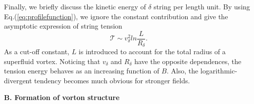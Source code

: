 \documentclass[12pt]{article}
\begin{document}
Finally, we briefly discuss the kinetic energy of $\delta$ string per length unit. 
By using Eq.(\ref{eq:profilefunction}), we ignore the constant
contribution and give the asymptotic expression of string tension 
\begin{equation}
  \label{eq:tension1}
  \mathcal{T} \sim v_\delta^2 ln\frac{L}{R_\delta}.
\end{equation}
As a cut-off constant, $L$ is introduced to account for the total radius of a superfluid vortex. 
Noticing that $v_\delta$ and $R_\delta$ have the opposite dependences, the tension energy behaves as an increasing function of $B$.
Also, the logarithmic-divergent tendency becomes much obvious for stronger fields.


\vspace{0.2cm}
\textbf{B. Formation of vorton structure }
\vspace{0.2cm}
\end{document}
